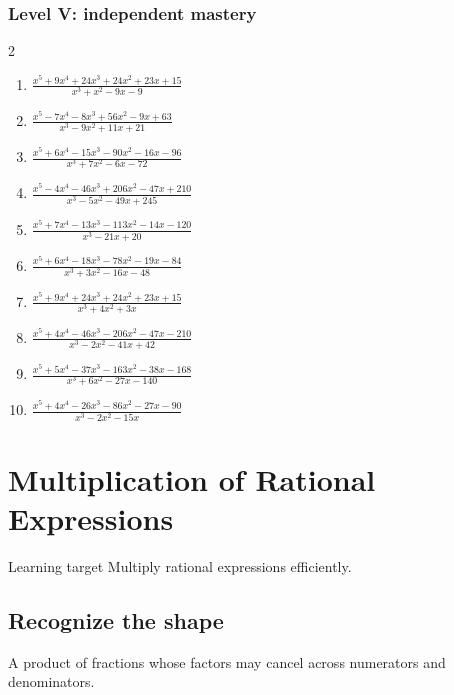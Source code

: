 \documentclass[11pt,oneside]{book}
\begin{document}
\subsection*{Level V: independent mastery}
\begin{multicols}{2}
\begin{enumerate}[leftmargin=*,label=\textbf{\arabic*.},itemsep=0.65\baselineskip]
\item $\displaystyle \frac{x^{5} + 9 x^{4} + 24 x^{3} + 24 x^{2} + 23 x + 15}{x^{3} + x^{2} - 9 x - 9}$
\item $\displaystyle \frac{x^{5} - 7 x^{4} - 8 x^{3} + 56 x^{2} - 9 x + 63}{x^{3} - 9 x^{2} + 11 x + 21}$
\item $\displaystyle \frac{x^{5} + 6 x^{4} - 15 x^{3} - 90 x^{2} - 16 x - 96}{x^{3} + 7 x^{2} - 6 x - 72}$
\item $\displaystyle \frac{x^{5} - 4 x^{4} - 46 x^{3} + 206 x^{2} - 47 x + 210}{x^{3} - 5 x^{2} - 49 x + 245}$
\item $\displaystyle \frac{x^{5} + 7 x^{4} - 13 x^{3} - 113 x^{2} - 14 x - 120}{x^{3} - 21 x + 20}$
\item $\displaystyle \frac{x^{5} + 6 x^{4} - 18 x^{3} - 78 x^{2} - 19 x - 84}{x^{3} + 3 x^{2} - 16 x - 48}$
\item $\displaystyle \frac{x^{5} + 9 x^{4} + 24 x^{3} + 24 x^{2} + 23 x + 15}{x^{3} + 4 x^{2} + 3 x}$
\item $\displaystyle \frac{x^{5} + 4 x^{4} - 46 x^{3} - 206 x^{2} - 47 x - 210}{x^{3} - 2 x^{2} - 41 x + 42}$
\item $\displaystyle \frac{x^{5} + 5 x^{4} - 37 x^{3} - 163 x^{2} - 38 x - 168}{x^{3} + 6 x^{2} - 27 x - 140}$
\item $\displaystyle \frac{x^{5} + 4 x^{4} - 26 x^{3} - 86 x^{2} - 27 x - 90}{x^{3} - 2 x^{2} - 15 x}$
\end{enumerate}
\end{multicols}
\chapter{Multiplication of Rational Expressions}
\begin{rulebox}{Learning target}
Multiply rational expressions efficiently.
\end{rulebox}
\section{Recognize the shape}
A product of fractions whose factors may cancel across numerators and denominators.
\end{document}
